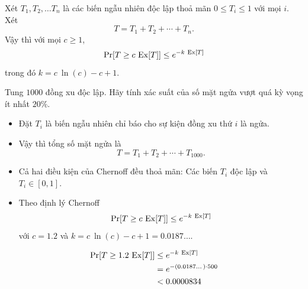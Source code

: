 \begin{frame}
	\begin{thrm}
		Xét $T_1,T_2, \dots T_n$ là các biến ngẫu nhiên độc lập thoả mãn $0\leq T_i \leq 1$ với mọi $i$. Xét 
		\[
			T = T_1 + T_2 + \cdots + T_n.
		\]
		Vậy thì với mọi $c\geq 1$,
		\[
			\pr[T \geq c\ \ex[T]] \leq e^{-k\ \ex[T]}
		\]
		trong đó $k = c\ \ln(c) - c +1$.
	\end{thrm}
\end{frame}
\begin{frame}
\begin{xmpl}
	Tung $1000$ đồng xu độc lập. Hãy tính xác suất của số mặt ngửa vượt quá kỳ vọng ít nhất $20\%$.
\end{xmpl}	


\end{frame}

\begin{frame}
  \begin{sol}
\begin{itemize}
	\item<+-> Đặt $T_i$ là biến ngẫu nhiên chỉ báo cho sự kiện đồng xu thứ $i$ là ngửa.
	\item<+-> Vậy thì tổng số mặt ngửa là 
	\[
		T = T_1 + T_2 + \cdots + T_{1000}.
	\] 
	
	\item<+-> Cả hai điều kiện của Chernoff đều thoả mãn: Các biến $T_i$ độc lập và $T_i \in [0,1]$. 
	\item<+-> Theo định lý Chernoff
	\[
		\pr[T \geq c\ \ex[T]] \leq e^{-k\ \ex[T]}
	\] 
	với $c = 1.2$ và  $k = c\ \ln(c) - c + 1 = 0.0187\dots$.
\end{itemize}    
  \end{sol}
\end{frame}
\begin{frame}
\begin{align*}
	\mathrm{Pr}[T \geq 1.2\ \mathrm{Ex}[T]] &\leq e^{-k\ \mathrm{Ex}[T]}\\
	                       &= e^{-(0.0187\dots)\cdot 500}\\
						   &< 0.0000834
\end{align*}
\end{frame}

